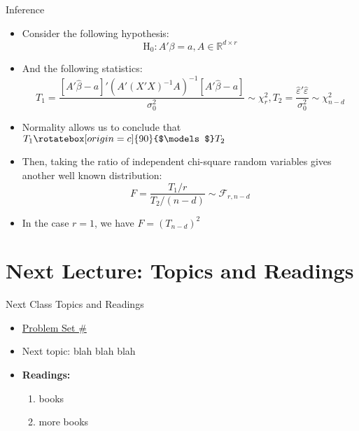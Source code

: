 \documentclass[fleqn, 10pt]{beamer}
\newcommand{\indep}{\rotatebox[origin=c]{90}{$\models$}}
\begin{document}
\begin{frame}{Inference}
	
	\begin{itemize}
		\item Consider the following hypothesis:
		\[ \mathrm{H}_0: A' \beta = a, A \in \mathbb{R}^{d\times r} \]
		\item And the following statistics:
		\[ T_1 = \frac{[A'\hat{\beta}-a]'(A'(X'X)^{-1}A)^{-1}[A'\hat{\beta}-a]}{\sigma_0^2} \sim \chi^2_{r}, T_2 = \frac{\hat{\varepsilon}'\hat{\varepsilon}}{\sigma_0^2} \sim \chi^2_{n-d} \]
		\item Normality allows us to conclude that \( T_1 \indep T_2 \)
		\item Then, taking the ratio of independent chi-square random variables gives another well known distribution:
		\[ F = \frac{T_1 / r}{T_2 / (n-d)} \sim \mathcal{F}_{r,n-d} \]
		\item In the case \(r=1\), we have \( F = (T_{n-d})^2 \)
		
	\end{itemize}
	
\end{frame}


\section{Next Lecture: Topics and Readings}

\begin{frame}{Next Class Topics and Readings}
	
	\begin{itemize}
		\item \underline{Problem Set \#}
		\item Next topic: blah blah blah
		\item \textbf{Readings:}
		\begin{enumerate}
			\item books
			\item more books
		\end{enumerate}
	\end{itemize}
	
\end{frame}
\end{document}
